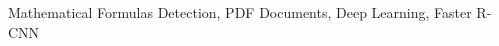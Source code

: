 \documentclass[conference]{IEEEtran}
\begin{document}
\begin{IEEEkeywords}
Mathematical Formulas Detection,
PDF Documents, 
Deep Learning,
Faster R-CNN
\end{IEEEkeywords}














\nocite{*}

%
\printbibliography
\end{document}
